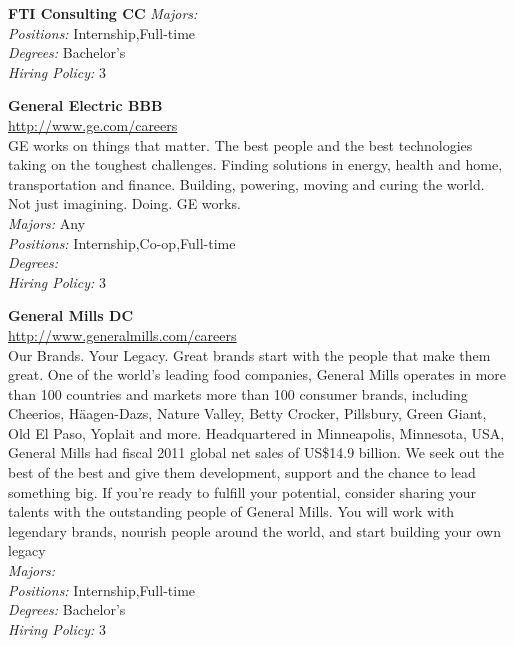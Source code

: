 \documentclass[twoside]{article}
\begin{document}
\begin{center}
\begin{multicols}{2}
\begin{minipage}{.95\columnwidth}{\Large\bf FTI Consulting \hfill CC}
    \emph{Majors:} \\
    \emph{Positions:} Internship,Full-time\\
    \emph{Degrees:} Bachelor's\\
    \emph{Hiring Policy:} 3\\
\end{minipage}
 \begin{minipage}{.95\columnwidth}{\Large\bf General Electric \hfill BBB}\\
    \url{http://www.ge.com/careers}\\
    GE works on things that matter. The best people and the best technologies taking on the toughest challenges. Finding solutions in energy, health and home, transportation and finance. Building, powering, moving and curing the world. Not just imagining. Doing. GE works.\\
    \emph{Majors:} Any\\
    \emph{Positions:} Internship,Co-op,Full-time\\
    \emph{Degrees:} \\
    \emph{Hiring Policy:} 3\\
\end{minipage}
 \begin{minipage}{.95\columnwidth}{\Large\bf General Mills \hfill DC}\\
    \url{http://www.generalmills.com/careers}\\
    Our Brands. Your Legacy. Great brands start with the people that make them great. One of the world's leading food companies, General Mills operates in more than 100 countries and markets more than 100 consumer brands, including Cheerios, Häagen-Dazs, Nature Valley, Betty Crocker, Pillsbury, Green Giant, Old El Paso, Yoplait and more. Headquartered in Minneapolis, Minnesota, USA, General Mills had fiscal 2011 global net sales of US\$14.9 billion. We seek out the best of the best and give them development, support and the chance to lead something big. If you’re ready to fulfill your potential, consider sharing your talents with the outstanding people of General Mills. You will work with legendary brands, nourish people around the world, and start building your own legacy\\
    \emph{Majors:} \\
    \emph{Positions:} Internship,Full-time\\
    \emph{Degrees:} Bachelor's\\
    \emph{Hiring Policy:} 3\\
\end{minipage}

\end{multicols}
\end{center}
\end{document}
